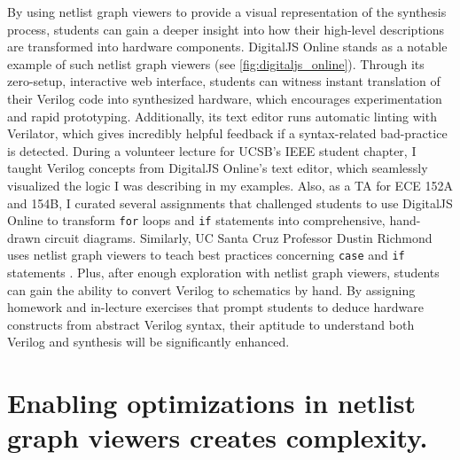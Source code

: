By using netlist graph viewers to provide a visual representation of the synthesis process, students can gain a deeper insight into how their high-level descriptions are transformed into hardware components.
DigitalJS Online \cite{DigitalJSOnline} stands as a notable example of such netlist graph viewers (see \autoref{fig:digitaljs_online}).
Through its zero-setup, interactive web interface, students can witness instant translation of their Verilog code into synthesized hardware, which encourages experimentation and rapid prototyping.
Additionally, its text editor runs automatic linting with Verilator, which gives incredibly helpful feedback if a syntax-related bad-practice is detected.
During a volunteer lecture for UCSB's IEEE student chapter, I taught Verilog concepts from DigitalJS Online's text editor, which seamlessly visualized the logic I was describing in my examples.
Also, as a TA for ECE 152A and 154B, I curated several assignments that challenged students to use DigitalJS Online to transform \texttt{for} loops and \texttt{if} statements into comprehensive, hand-drawn circuit diagrams.
Similarly, UC Santa Cruz Professor Dustin Richmond uses netlist graph viewers to teach best practices concerning \texttt{case} and \texttt{if} statements \cite{RichmondLatchUp}.
Plus, after enough exploration with netlist graph viewers, students can gain the ability to convert Verilog to schematics by hand.
By assigning homework and in-lecture exercises that prompt students to deduce hardware constructs from abstract Verilog syntax, their aptitude to understand both Verilog and synthesis will be significantly enhanced.

\FloatBarrier

\section{Enabling optimizations in netlist graph viewers creates complexity.}
\label{section:optimizations_in_netlist_graph_viewers}



